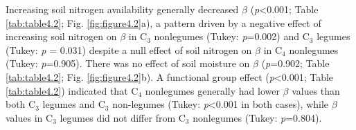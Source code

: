 Increasing soil nitrogen availability generally decreased $\beta$  (\textit{p}<0.001; Table \ref{tab:table4.2}; Fig. \ref{fig:figure4.2}a), a pattern driven by a negative effect of increasing soil nitrogen on $\beta$  in C$_3$ nonlegumes (Tukey: \textit{p}=0.002) and C$_3$ legumes (Tukey: \textit{p} = 0.031) despite a null effect of soil nitrogen on $\beta$ in C$_4$ nonlegumes (Tukey: \textit{p}=0.905). There was no effect of soil moisture on $\beta$  (\textit{p}=0.902; Table \ref{tab:table4.2}; Fig. \ref{fig:figure4.2}b). A functional group effect (\textit{p}<0.001; Table \ref{tab:table4.2}) indicated that C$_4$ nonlegumes generally had lower $\beta$ values than both C$_3$ legumes and C$_3$ non-legumes (Tukey: \textit{p}<0.001 in both cases), while $\beta$ values in C$_3$ legumes did not differ from C$_3$ nonlegumes (Tukey: \textit{p}=0.804).

